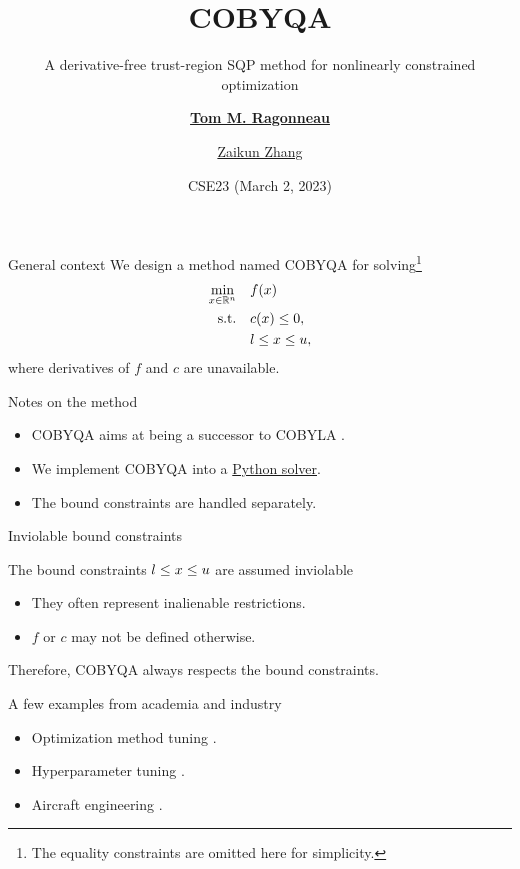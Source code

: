 \documentclass[
]{presentation}
\title{COBYQA}
\subtitle{A derivative-free trust-region SQP method for nonlinearly constrained optimization}
\date{CSE23 (March 2, 2023)}
\author{\href{https://www.tomragonneau.com/}{\textbf{Tom M. Ragonneau}} \and \href{https://www.zhangzk.net/}{Zaikun Zhang}}
\institute{
    Department of Applied Mathematics\\
    The Hong Kong Polytechnic University
}
\newcommand{\obj}{f}
\newcommand{\con}{c}
\newcommand{\iter}[1][]{x\ifblank{#1}{}{^{#1}}}
\newcommand{\xl}{l}
\newcommand{\xu}{u}
\begin{document}
\maketitle

\begin{frame}{General context}
    We design a method named COBYQA for solving\footnote{The equality constraints are omitted here for simplicity.}
    \begin{align*}
        \min_{\iter \in \R^n}   & \quad \obj(\iter)\\
        \mathrm{s.t.}           & \quad \con(\iter) \le 0,\\
                                & \quad \xl \le \iter \le \xu,
    \end{align*}
    where derivatives of $\obj$ and $\con$ are \alert{unavailable}.

    \medskip

    \begin{block}{Notes on the method}
        \begin{itemize}
            \item COBYQA aims at being a \alert{successor} to COBYLA \parencite{Powell_1994}.
            \item We \alert{implement} COBYQA into a \href{https://pypi.org/project/cobyqa/}{Python solver}.
            \item The bound constraints are handled \alert{separately}.
        \end{itemize}
    \end{block}
\end{frame}

\begin{frame}{Inviolable bound constraints}
    \begin{block}{The bound constraints $\xl \le \iter \le \xu$ are assumed inviolable}
        \begin{itemize}
            \item They often represent \alert{inalienable} restrictions.
            \item $\obj$ or $\con$ may not be defined otherwise.
        \end{itemize}
    \end{block}

    \medskip

    Therefore, COBYQA \alert{always} respects the bound constraints.

    \medskip

    \begin{block}{A few examples from academia and industry}
        \begin{itemize}
            \item Optimization method tuning \parencite{Audet_Orban_2006}.
            \item Hyperparameter tuning \parencite{Ghanbari_Scheinberg_2017}.
            \item Aircraft engineering \parencite{Gazaix_Etal_2019}.
        \end{itemize}
    \end{block}
\end{frame}
\end{document}
